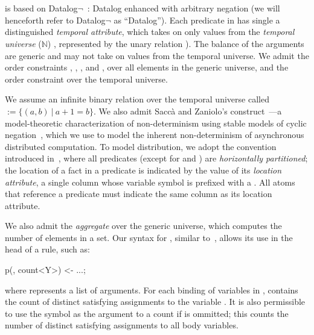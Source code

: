 \section{\large \bf \lang}
\label{sec:slang}

\lang is based on Datalog$\lnot$~\cite{ullmanbook}: Datalog enhanced with arbitrary negation (we will henceforth refer to Datalog$\lnot$ as ``Datalog'').  Each predicate in \lang has single a distinguished {\em temporal attribute}, which takes on only values from the {\em temporal universe} ($\mathbb{N}$)
, represented by the unary relation ).
The balance of the arguments are generic and may not take on values from the temporal universe.  We admit the order constraints \dedalus{<}, \dedalus{=}, \dedalus{!=}, and \dedalus{<=}, over all elements in the generic universe, and the order constraint \dedalus{<} over the temporal universe.

We assume an infinite binary relation over the temporal universe
called  $:= \{(a,b) \ | \ a + 1 = b\}$.  We also admit Sacc\`{a} and Zaniolo's  construct~\cite{sacca-zaniolo}---a model-theoretic characterization of non-determinism using stable models of cyclic negation~\cite{stable-model}, which we use to model the inherent non-determinism of asynchronous distributed computation.  To model distribution, we adopt the convention introduced in~\cite{Loo:2005}, where all predicates (except for  and ) are {\em horizontally partitioned};  the location of a fact in a predicate is indicated by the value of its {\em location attribute}, a single column whose variable symbol is prefixed with a \dedalus{\#}.  All atoms that reference a predicate must indicate the same column as its location attribute.

We also admit the  {\em aggregate} over the generic universe, which computes the number of elements in a set.  Our syntax for , similar to~\cite{datalog-agg}, allows its use in the head of a rule, such as:

\begin{Dedalus}
p(, count<Y>) <- ...;
\end{Dedalus}

where  represents a list of arguments.  For each binding of variables in ,  contains the count of distinct satisfying assignments to the variable .  It is also permissible to use the symbol \dedalus{*} as the argument to a count if  is ommitted; this counts the number of distinct satisfying assignments to all body variables.

